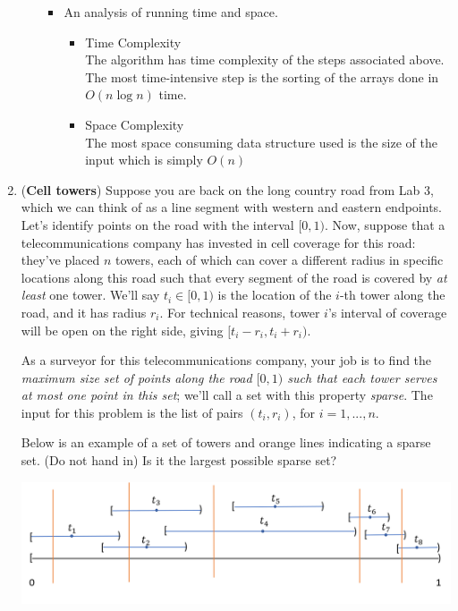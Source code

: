 \documentclass[letterpaper,11pt]{article}
\begin{document}
\begin{enumerate}
\begin{itemize}
\begin{itemize}
          \item An analysis of running time and space.
              \begin{itemize}
                  \item Time Complexity\\
                      The algorithm has time complexity of the steps associated
                      above. The most time-intensive step is the sorting of the 
                      arrays done in $O\left( n\log{n}\right) $ time. 
                  \item Space Complexity\\
                      The most space consuming data structure used is the size
                      of the input which is simply $O\left( n \right) $
              \end{itemize}
      \end{itemize}
  \end{itemize}
  
  
  
  
  
  \newpage
  \item(\textbf{Cell towers}) Suppose you are back on the long country road from Lab 3, which we can think of as a line segment with western and eastern endpoints. Let's identify points on the road with the interval $[0,1)$. Now, suppose that a  telecommunications company has invested in cell coverage for this road: they've placed $n$ towers, each of which can cover a different radius  in specific locations along this road such that every segment of the road is covered by \emph{at least} one tower. We'll say $t_i\in [0,1)$ is the location of the $i$-th tower along the road, and it has radius $r_i$. For technical reasons, tower $i$'s interval of coverage will be open on the right side, giving $[t_i - r_i, t_i + r_i)$. 
  
  As a surveyor for this telecommunications company, your job is to find the \textit{maximum size set of points along the road $[0,1)$ such that each
tower serves at most one point in this set}; we'll call a  set with this property \textit{sparse}.  The input for this problem is the list of pairs $(t_i,r_i)$, for $i=1,...,n$.



Below is an example of a set of towers and orange lines indicating a sparse set. (Do not hand in) Is it the largest possible sparse set?

\begin{center}
    \includegraphics[scale=0.7]{cell_tower_set}
\end{center}




\end{enumerate}
\end{document}
